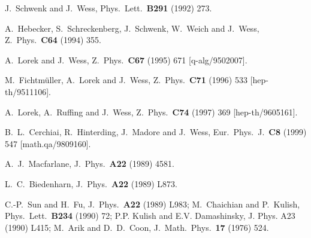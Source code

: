 \documentclass[a4paper,12pt]{article}
\begin{document}
\begin{thebibliography}{99}

J.~Schwenk and J.~Wess,
Phys.\ Lett.\ {\bf B291} (1992) 273.

A.~Hebecker, S.~Schreckenberg, J.~Schwenk, W.~Weich and J.~Wess,
Z.\ Phys.\ {\bf C64} (1994) 355.

A.~Lorek and J.~Wess,
Z.\ Phys.\ {\bf C67} (1995) 671
[q-alg/9502007].

M.~Fichtm\"uller, A.~Lorek and J.~Wess,
Z.\ Phys.\ {\bf C71} (1996) 533
[hep-th/9511106].

A.~Lorek, A.~Ruffing and J.~Wess,
Z.\ Phys.\ {\bf C74} (1997) 369
[hep-th/9605161].

B.~L.~Cerchiai, R.~Hinterding, J.~Madore and J.~Wess,
Eur.\ Phys.\ J.\ {\bf C8} (1999) 547
[math.qa/9809160].


A.~J.~Macfarlane,
J.\ Phys.\ {\bf A22} (1989) 4581.

L.~C.~Biedenharn,
J.\ Phys.\ {\bf A22} (1989) L873.

C.-P.~Sun and H.~Fu,
J.\ Phys.\ {\bf A22} (1989) L983;
%
M.~Chaichian and P.~Kulish,
Phys.\ Lett.\ {\bf B234} (1990) 72;
%
P.P. Kulish and E.V. Damashinsky, J. Phys. A23 (1990) L415; 
%
M.~Arik and D.~D.~Coon,
J.\ Math.\ Phys.\ {\bf 17} (1976) 524.


\end{thebibliography}
\end{document}

